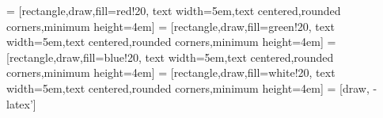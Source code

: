 \documentclass{article}
\begin{document}
\pagestyle{empty}

 = [rectangle,draw,fill=red!20,
	text width=5em,text centered,rounded corners,minimum height=4em]
 = [rectangle,draw,fill=green!20,
	text width=5em,text centered,rounded corners,minimum height=4em]
 = [rectangle,draw,fill=blue!20,
	text width=5em,text centered,rounded corners,minimum height=4em]
 = [rectangle,draw,fill=white!20,
	text width=5em,text centered,rounded corners,minimum height=4em]
 = [draw, -latex']
\end{document}
